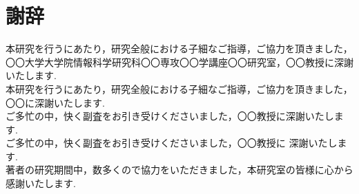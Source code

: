 \chapter*{謝辞}

本研究を行うにあたり，研究全般における子細なご指導，ご協力を頂きました，
〇〇大学大学院情報科学研究科〇〇専攻〇〇学講座〇〇研究室，〇〇教授に深謝いたします.
\\[0.5cm]
本研究を行うにあたり，研究全般における子細なご指導，ご協力を頂きました，〇〇に深謝いたします.
\\[0.5cm]
ご多忙の中，快く副査をお引き受けくださいました，〇〇教授に深謝いたします.
\\[0.7cm]
ご多忙の中，快く副査をお引き受けくださいました，〇〇教授に 深謝いたします.
\\[0.7cm]
著者の研究期間中，数多くので協力をいただきました，本研究室の皆様に心から感謝いたします.
